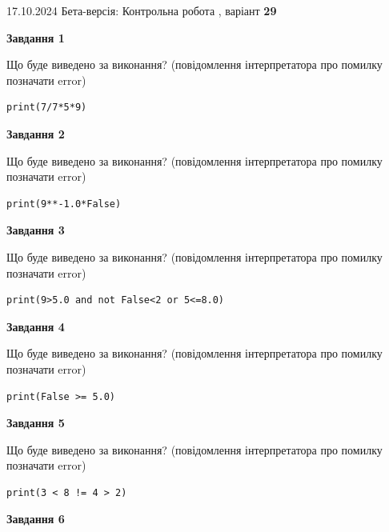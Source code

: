 \documentclass[12pt, ukrainian]{article}
\begin{document}
{\Large{17.10.2024 Бета-версія: Контрольна робота , варіант  \No \textbf { 29 }\par}}
{
\begin {large}
{\begin {center}\textbf{Завдання 1}\end {center}}

Що буде виведено за виконання? (повідомлення інтерпретатора про помилку позначати error)\par
\begin{verbatim}
print(7/7*5*9)
\end{verbatim}

{\begin {center}\textbf{Завдання 2}\end {center}}

Що буде виведено за виконання? (повідомлення інтерпретатора про помилку позначати error)\par
\begin{verbatim}
print(9**-1.0*False)
\end{verbatim}

{\begin {center}\textbf{Завдання 3}\end {center}}

Що буде виведено за виконання? (повідомлення інтерпретатора про помилку позначати error)\par
\begin{verbatim}
print(9>5.0 and not False<2 or 5<=8.0)
\end{verbatim}

{\begin {center}\textbf{Завдання 4}\end {center}}

Що буде виведено за виконання? (повідомлення інтерпретатора про помилку позначати error)\par
\begin{verbatim}
print(False >= 5.0)
\end{verbatim}

{\begin {center}\textbf{Завдання 5}\end {center}}

Що буде виведено за виконання? (повідомлення інтерпретатора про помилку позначати error)\par
\begin{verbatim}
print(3 < 8 != 4 > 2)
\end{verbatim}

{\begin {center}\textbf{Завдання 6}\end {center}}


\end{large}}
\end{document}
